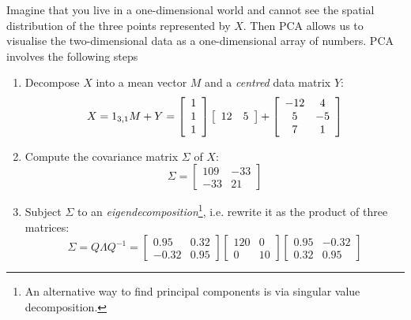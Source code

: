 Imagine that you live in a one-dimensional world and cannot see the
spatial distribution of the three points represented by $X$. Then PCA
allows us to visualise the two-dimensional data as a one-dimensional
array of numbers. PCA involves the following steps
\begin{enumerate}
\item Decompose $X$ into a mean vector $M$ and a \emph{centred} data
  matrix $Y$:
  \begin{equation}
    X = 1_{3,1} M + Y =
    \left[
      \begin{array}{c}
        1 \\
        1 \\
        1
      \end{array}
      \right]
    \left[
      \begin{array}{cc}
        12 & 5
      \end{array}
      \right]
    +
    \left[
      \begin{array}{cc}
        -12 &  4 \cr
          5 & -5 \cr
          7 &  1
      \end{array}
      \right]
    \label{eq:XMY}
  \end{equation}

\item Compute the covariance matrix $\Sigma$ of $X$:
  \begin{equation}
    \Sigma =
    \left[
      \begin{array}{cc}
        109 & -33 \\
        -33 &  21
      \end{array}
      \right]
  \end{equation}

\item Subject $\Sigma$ to an \emph{eigendecomposition}\footnote{An
alternative way to find principal components is via singular value
decomposition.}, i.e. rewrite it as the product of three matrices:
  \begin{equation}
    \Sigma = Q \Lambda Q^{-1} =
    \left[
      \begin{array}{cc}
         0.95 & 0.32 \\
        -0.32 & 0.95
      \end{array}
      \right]
    \left[
      \begin{array}{cc}
        120 & 0 \\
        0 & 10
      \end{array}
      \right]
    \left[
      \begin{array}{cc}
        0.95 & -0.32 \\
        0.32 & 0.95
      \end{array}
      \right]
    \label{eq:eigen}
  \end{equation}


\end{enumerate}
